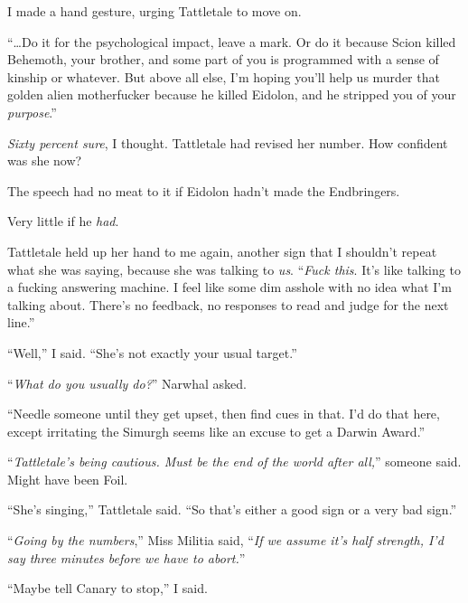 I made a hand gesture, urging Tattletale to move on.



``\ldots{}Do it for the psychological impact, leave a mark.  Or do it because Scion killed Behemoth, your brother, and some part of you is programmed with a sense of kinship or whatever.  But above all else, I'm hoping you'll help us murder that golden alien motherfucker because he killed Eidolon, and he stripped you of your \emph{purpose}.''



\emph{Sixty percent sure}, I thought.  Tattletale had revised her number.  How confident was she now?



The speech had no meat to it if Eidolon hadn't made the Endbringers.



Very little if he \emph{had}.



Tattletale held up her hand to me again, another sign that I shouldn't repeat what she was saying, because she was talking to \emph{us}.  ``\emph{Fuck this}.  It's like talking to a fucking answering machine.  I feel like some dim asshole with no idea what I'm talking about.  There's no feedback, no responses to read and judge for the next line.''



``Well,'' I said.  ``She's not exactly your usual target.''



``\emph{What do you usually do?}''  Narwhal asked.



``Needle someone until they get upset, then find cues in that.  I'd do that here, except irritating the Simurgh seems like an excuse to get a Darwin Award.''



``\emph{Tattletale's being cautious.  Must be the end of the world after all,}'' someone said.  Might have been Foil.



``She's singing,'' Tattletale said.  ``So that's either a good sign or a very bad sign.''



``\emph{Going by the numbers},'' Miss Militia said, ``\emph{If we assume it's half strength, I'd say three minutes before we have to abort.}''



``Maybe tell Canary to stop,'' I said.



